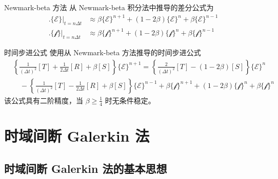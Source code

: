 \begin{theorem}{Newmark-beta 方法}
    从 Newmark-beta 积分法中推导的差分公式为
    \begin{align}
        \Big.\{\mathscr{E}\}\Big|_{t=n\Delta t}
        &\approx \beta\{\mathscr{E}\}^{n+1}
        +(1-2\beta)\{\mathscr{E}\}^{n}
        +\beta\{\mathscr{E}\}^{n-1}\\
        \Big.\{\mathscr{f}\}\Big|_{t=n\Delta t}
        &\approx \beta\{\mathscr{f}\}^{n+1}
        +(1-2\beta)\{\mathscr{f}\}^{n}
        +\beta\{\mathscr{f}\}^{n-1}
    \end{align}
\end{theorem}

\begin{theorem}{时间步进公式}
    使用从 Newmark-beta 方法推导的时间步进公式
    \begin{equation}
        \begin{aligned}
            &\left\{
                \frac{1}{(\Delta t)^2}[T]
                +\frac{1}{2\Delta t}[R]
                +\beta [S]
            \right\}\{\mathscr{E}\}^{n+1}
            =\left\{
                \frac{2}{(\Delta t)^2}[T]
                -(1-2\beta)[S]
            \right\}\{\mathscr{E}\}^n\\
            &\quad-\left\{
                \frac{1}{(\Delta t)^2}[T]
                -\frac{1}{2\Delta t}[R]
                +\beta [S]
            \right\}\{\mathscr{E}\}^{n-1}
            +\beta\{\mathscr{f}\}^{n+1}
            +(1-2\beta)\{\mathscr{f}\}^{n}
            +\beta\{\mathscr{f}\}^n
        \end{aligned}
    \end{equation}
    该公式具有二阶精度，当 $\beta\geq\frac{1}{4}$ 时无条件稳定。
\end{theorem}

\section{时域间断 Galerkin 法}

\subsection{时域间断 Galerkin 法的基本思想}

